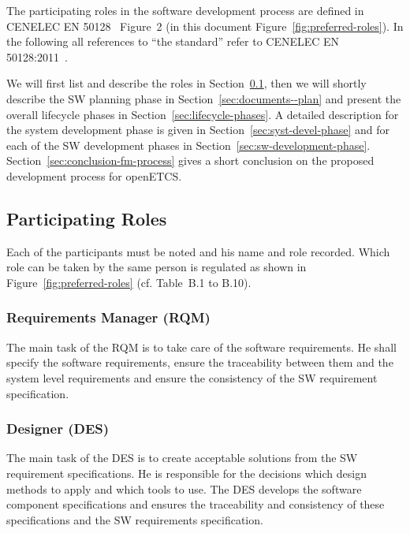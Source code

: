 
The participating roles in the software development process are defined in
CENELEC EN 50128~\cite{EN-50128} Figure~2 (in this document
Figure~\ref{fig:preferred-roles}). In the following all references to ``the
standard'' refer to CENELEC EN 50128:2011~\cite{EN-50128}.

We will first list and describe the roles in
Section~\ref{sec:participating-roles}, then we will shortly describe the SW
planning phase in Section~\ref{sec:documents--plan} and present the overall
lifecycle phases in Section~\ref{sec:lifecycle-phases}. A detailed description
for the system development phase is given in Section~\ref{sec:syst-devel-phase}
and for each of the SW development phases in
Section~\ref{sec:sw-development-phase}. Section~\ref{sec:conclusion-fm-process}
gives a short conclusion on the proposed development process for openETCS.

\subsection{Participating Roles}
\label{sec:participating-roles}

Each of the participants must be noted and his name and role recorded. Which
role can be taken by the same person is regulated as shown in
Figure~\ref{fig:preferred-roles} (cf. Table~B.1 to B.10).

\subsubsection{Requirements Manager (RQM)}
\label{sec:requ-magang-rqm}

The main task of the RQM is to take care of the software requirements. He shall
specify the software requirements, ensure the traceability between them and the
system level requirements and ensure the consistency of the SW requirement
specification.

\subsubsection{Designer (DES)}
\label{sec:designer}

The main task of the DES is to create acceptable solutions from the SW
requirement specifications. He is responsible for the decisions which design
methods to apply and which tools to use. The DES develops the software component
specifications and ensures the traceability and consistency of these
specifications and the SW requirements specification.

